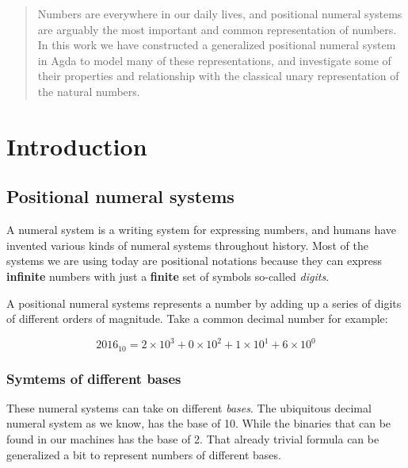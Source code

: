\documentclass[12pt, a4paper]{article}
\begin{document}
\maketitle

\begin{abstract}
Numbers are everywhere in our daily lives, and positional numeral systems are
arguably the most important and common representation of numbers. In this work
we have constructed a generalized positional numeral system in Agda to model many
of these representations, and investigate some of their properties and relationship
with the classical unary representation of the natural numbers.

\end{abstract}

\section{Introduction}

\subsection{Positional numeral systems}\label{num}

A numeral system is a writing system for expressing numbers, and humans have
invented various kinds of numeral systems throughout history. Most of the
systems we are using today are positional notations because they can express
\textbf{infinite} numbers with just a \textbf{finite} set of symbols so-called
\textit{digits}.

A positional numeral systems represents a number by adding up a series of digits
of different orders of magnitude. Take a common decimal number for example:

$$ 2016_{10} = 2\times10^3 + 0\times10^2 + 1\times10^1 + 6\times10^0 $$

\subsubsection{Symtems of different bases}

These numeral systems can take on different \textit{bases}. The ubiquitous decimal
numeral system as we know, has the base of 10. While the binaries that can be found
in our machines has the base of 2. That already trivial formula can be generalized
a bit to represent numbers of different bases.
\end{document}
